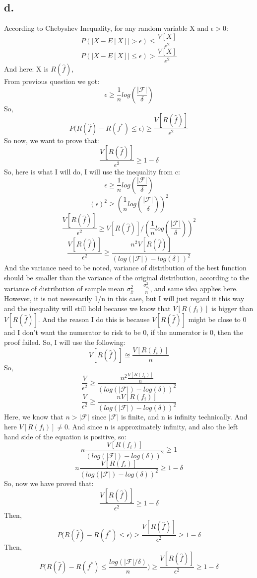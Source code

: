 \documentclass{article}
\begin{document}
\subsection*{d.}
According to Chebyshev Inequality, for any random variable X and $\epsilon > 0$:
\[ P( |X - E[X]| > \epsilon ) \le \frac{V[X]}{\epsilon^2}  \]
\[ P( |X - E[X]| \le \epsilon ) > \frac{V[X]}{\epsilon^2}  \]
And here: X is $ R(\hat{f}) $, \\
From previous question we got: 
\[ \epsilon \ge \frac{1}{n} log(\frac{|\mathcal{F}|}{\delta}) \]
So,
\[ P\big( R(\hat{f}) - R(f^*) \le \epsilon \big) \ge \frac{V[R(\hat{f})]}{\epsilon^2} \]
So now, we want to prove that:
\[ \frac{V[R(\hat{f})]}{\epsilon^2} \ge 1 - \delta \]
So, here is what I will do, I will use the inequality from c:
\[ \epsilon \ge  \frac{1}{n} log(\frac{|\mathcal{F}|}{\delta})  \]
\[ (\epsilon)^2 \ge ( \frac{1}{n} log(\frac{|\mathcal{F}|}{\delta}) ) ^2 \]
\[ \frac{V[R(\hat{f})]}{\epsilon^2} \ge V[R(\hat{f})] / ( \frac{1}{n} log(\frac{|\mathcal{F}|}{\delta}) ) ^2 \]
\[  \frac{V[R(\hat{f})]}{\epsilon^2} \ge \frac{n^2 V[R(\hat{f})] }{( log(|\mathcal{F}|) - log(\delta ) )^2} \]
And the variance need to be noted, variance of distribution of the best function should be smaller than the variance of the original distribution, according to the variance of distribution of sample mean $\sigma^2_{\bar{x}} = \frac{\sigma^2_{x_i}}{n} $, and same idea applies here. However, it is not nessesarily 1/n in this case, but I will just regard it this way and the inequality will still hold because we know that $V[R(f_i)]$ is bigger than $V[ R(\hat{f}) ]$. And the reason I do this is because $V[R(\hat{f})]$ might be close to 0 and I don't want the numerator to risk to be 0, if the numerator is 0, then the proof failed. So, I will use the following:
\[ V[R(\hat{f})] \approxeq \frac{V[R(f_i)]}{n} \]
So,
\[  \frac{V}{\epsilon^2} \ge \frac{n^2 \frac{V[R(f_i)]}{n} }{( log(|\mathcal{F}|) - log(\delta ) )^2} \]
\[  \frac{V}{\epsilon^2} \ge \frac{n V[R(f_i)] }{( log(|\mathcal{F}|) - log(\delta ) )^2} \]
Here, we know that $n > |\mathcal{F}|$ since $|\mathcal{F}|$ is finite, and n is infinity technically. And here $V[R(f_i)] \neq 0$. And since n is approximately infinity, and also the left hand side of the equation is positive, so:
\[ n \frac{V[R(f_i)] }{( log(|\mathcal{F}|) - log(\delta ) )^2} \ge 1 \]
\[ n \frac{ V[R(f_i)] }{( log(|\mathcal{F}|) - log(\delta ) )^2} \ge 1 - \delta \]
So, now we have proved that:
\[ \frac{V[R(\hat{f})]}{\epsilon^2} \ge 1 - \delta \]
Then,
\[ P\big( R(\hat{f}) - R(f^*) \le \epsilon \big) \ge \frac{V[R(\hat{f})]}{\epsilon^2} \ge 1 - \delta\]
Then,
\[ P\big( R(\hat{f}) - R(f^*) \le \frac{log(|\mathcal{F}| / \delta)}{n} \big) \ge \frac{V[R(\hat{f})]}{\epsilon^2} \ge 1 - \delta \]
\end{document}
